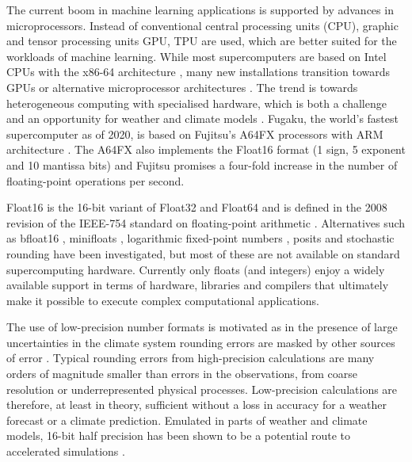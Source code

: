 The current boom in machine learning applications is supported by advances in microprocessors. Instead of conventional central
processing units (CPU), graphic and tensor processing units GPU, TPU \citep{Jouppi2018,Jouppi2018a,Jouppi2017,Steinkraus2005}
are used, which are better suited for the workloads of machine learning. While most supercomputers are based on Intel CPUs with
the x86-64 architecture \citep{Dongarra2011}, many new installations transition towards GPUs or alternative microprocessor architectures
\citep{Zheng2020}. The trend is towards heterogeneous computing with specialised hardware, which is both a challenge and an
opportunity for weather and climate models \citep{Bauer2021,Bauer2021a}. Fugaku, the world’s fastest supercomputer as of 2020,
is based on Fujitsu’s A64FX processors with ARM architecture \citep{Odajima2020,Sato2020}. The A64FX also implements the
Float16 format (1 sign, 5 exponent and 10 mantissa bits) and Fujitsu promises a four-fold increase in the number of floating-point
operations per second. 

Float16 is the 16-bit variant of Float32 and Float64 and is defined in the 2008 revision of the IEEE-754 standard on floating-point arithmetic
\citep{IEEE1985,IEEE2008}. Alternatives such as bfloat16 \citep{Burgess2019, Kalamkar2019}, minifloats \citep{Fox2020}, logarithmic
fixed-point numbers \citep{Johnson2020,Johnson2018,Sun2020}, posits
\citep{Gustafson2017a,Chaurasiya2018,Klower2019a,Klower2020a,Langroudi2019,Zhang2020} and stochastic rounding
\citep{Croci2020,Hopkins2020,Mikaitis2020,Paxton2021} have been investigated, but most of these are not available on
standard supercomputing hardware. Currently only floats (and integers) enjoy a widely available support in terms of hardware,
libraries and compilers that ultimately make it possible to execute complex computational applications.

The use of low-precision number formats is motivated as in the presence of large uncertainties in the climate system rounding
errors are masked by other sources of error \citep{Palmer2015}. Typical rounding errors from high-precision calculations are
many orders of magnitude smaller than errors in the observations, from coarse resolution or underrepresented physical processes.
Low-precision calculations are therefore, at least in theory, sufficient without a loss in accuracy for a weather forecast or a climate prediction.
Emulated in parts of weather and climate models, 16-bit half precision has been shown to be a potential route to accelerated simulations
\citep{Dawson2018,Chantry2019, Hatfield2019, Klower2020a}.

